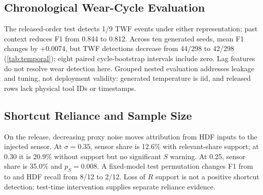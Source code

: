 \documentclass[conference]{IEEEtran}
\begin{document}
\subsection{Chronological Wear-Cycle Evaluation}
\begin{table}[t]
\centering
\caption{Nested chronological evaluation. TWF columns count detected/total flagged test rows. Generated F1 averages ten seeds; pooled counts are descriptive, not independent-row intervals. Paired cycle-bootstrap intervals are saved per sequence.}
\label{tab:temporal}
\footnotesize
\setlength{\tabcolsep}{2.5pt}

\end{table}

The released-order test detects 1/9 TWF events under either representation; past context reduces F1 from 0.844 to 0.812. Across ten generated seeds, mean F1 changes by +0.0074, but TWF detections decrease from 44/298 to 42/298 (\cref{tab:temporal}); eight paired cycle-bootstrap intervals include zero. Lag features do not resolve wear detection here. Grouped nested evaluation addresses leakage and tuning, not deployment validity: generated temperature is iid, and released rows lack physical tool IDs or timestamps.

\subsection{Shortcut Reliance and Sample Size}
On the release, decreasing proxy noise moves attribution from HDF inputs to the injected sensor. At $\sigma=0.35$, sensor share is 12.6\% with relevant-share support; at 0.30 it is 20.9\% without support but no significant $S$ warning. At 0.25, sensor share is 35.0\% and $p_S=0.008$. A fixed-model test permutation changes F1 from \ShortcutOriginalFone{} to \ShortcutShiftedFone{} and HDF recall from 8/12 to 2/12. Loss of $R$ support is not a positive shortcut detection; test-time intervention supplies separate reliance evidence.



\begin{table}[t]
\centering
\caption{Controlled five-seed effect replication with sigma-0.25 injection and fixed model/fold seed 42. Columns average held-out quantities across generation seeds. Shift F1 independently permutes the proxy within held-out folds, without refitting. No new $p$ values are inferred.}
\label{tab:effect-replication}
\footnotesize
\setlength{\tabcolsep}{3pt}

\end{table}
\end{document}
